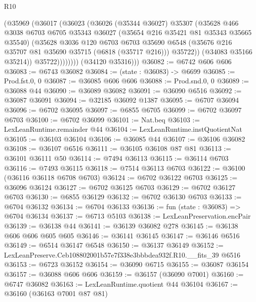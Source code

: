 \begin{lexlean}{R10}
\begin{coremodule}
                  (@35969
                    (@36017
                      (@36023
                        (@36026
                          (@35344 @36027)
                          @35307
                          (@35628
                            @466
                            @3038
                            @6703
                            @6705
                            @35343
                            @36027
                            (@35654 @216 @35421 @81 @35343 @35665 @35540)
                            (@35628
                              @3036
                              @120
                              @6703
                              @6703
                              @35690
                              @6548
                              (@35676 @216 @35707 @81 @35690 @35715 (@6818 (@35717 @216)))
                              @35722))
                          (@34083 @35166 @35214))
                        @35722))))))))
        (@34120 @35316)))
@36082 := @6742 @606 @606
@36083 := @6743 @36082
@36084 := (state : @36083) -> @6699
@36085 := Prod.fst.{0, 0}
@36087 := @36085 @606 @606
@36088 := Prod.snd.{0, 0}
@36089 := @36088 @44
@36090 := @36089 @36082
@36091 := @36090 @6516
@36092 := @36087 @36091
@36094 := @32185 @36092 @1387
@36095 := @6707 @36094
@36096 := @6702 @36095
@36097 := @6855 @6705
@36099 := @6702 @36097 @6703
@36100 := @6702 @36099
@36101 := Nat.beq
@36103 := LexLeanRuntime.remainder @44
@36104 := LexLeanRuntime.instQuotientNat
@36105 := @36103 @36104
@36106 := @36085 @44
@36107 := @36106 @36082
@36108 := @36107 @6516
@36111 := @36105 @36108 @87 @81
@36113 := @36101 @36111 @50
@36114 := @7494 @36113
@36115 := @36114 @6703
@36116 := @7493 @36115
@36118 := @7514 @36113 @6703
@36122 := @36100 (@36116 @36118 @6708 @6703)
@36124 := @6702 @36122 @6703
@36125 := @36096 @36124
@36127 := @6702 @36125 @6703
@36129 := @6702 @36127 @6703
@36130 := @6855 @36129
@36132 := @6702 @36130 @6703
@36133 := @6704 @36132
@36134 := @6704 @36133
@36136 := fun (state : @36083) => @6704 @36134
@36137 := @6713 @5103
@36138 := LexLeanPreservation.encPair
@36139 := @36138 @44
@36141 := @36139 @36082 @278
@36145 := @36138 @606 @606 @605 @605
@36146 := @36141 @36145
@36147 := @36146 @6516
@36149 := @6514 @36147 @6548
@36150 := @36137 @36149
@36152 := LexLeanPreserve.Ceb108802001b57e7f338e3bbbdea932f.R10.__fits_39 @6516
@36153 := @6723 @36152
@36154 := @36090 @6715
@36155 := @36087 @36154
@36157 := @36088 @606 @606
@36159 := @36157 (@36090 @7001)
@36160 := @6747 @36082
@36163 := LexLeanRuntime.quotient @44 @36104
@36167 := @36160 (@36163 @7001 @87 @81)

\end{coremodule}
\end{lexlean}
